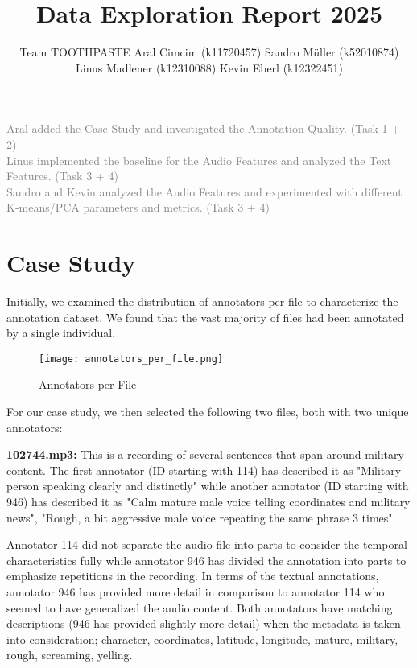 \documentclass{article}
\title{Data Exploration Report 2025}
\author{%
  Team TOOTHPASTE \AND
  Aral Cimcim (k11720457)
  \And
  Sandro Müller (k52010874)
  \And 
  Linus Madlener (k12310088)
  \And 
  Kevin Eberl (k12322451)
}
\begin{document}
\maketitle

\begin{contributions}
    \textcolor{gray}{
    Aral added the Case Study and investigated the Annotation Quality. (Task 1 + 2) \\
    Linus implemented the baseline for the Audio Features and analyzed the Text Features. (Task 3 + 4) \\
    Sandro and Kevin analyzed the Audio Features and experimented with different K-means/PCA parameters and metrics. (Task 3 + 4) \\
    }
  
\end{contributions}

\section{Case Study}
Initially, we examined the distribution of annotators per file to characterize the annotation dataset. We found that the vast majority of files had been annotated by a single individual.

\begin{figure}[H]
    \centering
    \texttt{[image: annotators\_per\_file.png]}
    \caption{Annotators per File}
    \label{fig:enter-label}
\end{figure}

For our case study, we then selected the following two files, both with two unique annotators:

\textbf{102744.mp3:}
This is a recording of several sentences that span around military content. The first annotator (ID starting with 114) has described it as "Military person speaking clearly and distinctly" while another annotator (ID starting with 946) has described it as "Calm mature male voice telling coordinates and military news", "Rough, a bit aggressive male voice repeating the same phrase 3 times". 

Annotator 114 did not separate the audio file into parts to consider the temporal characteristics fully while annotator 946 has divided the annotation into parts to emphasize repetitions in the recording. In terms of the textual annotations, annotator 946 has provided more detail in comparison to annotator 114 who seemed to have generalized the audio content. Both annotators have matching descriptions (946 has provided slightly more detail) when the metadata is taken into consideration; character, coordinates, latitude, longitude, mature, military, rough, screaming, yelling.
\end{document}

